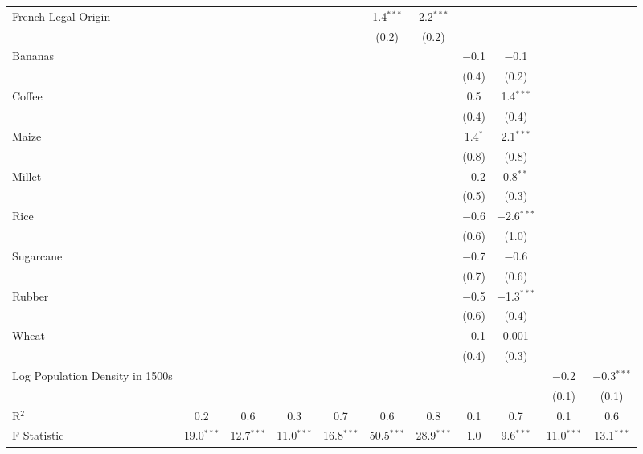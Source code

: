 \begin{table}[!htbp]
\begin{threeparttable}
\begin{tabular}{@{\extracolsep{0pt}}lcccccccccc}
  French Legal Origin &  &  &  &  & 1.4$^{***}$ & 2.2$^{***}$ &  &  &  &  \\ 
  &  &  &  &  & (0.2) & (0.2) &  &  &  &  \\ 
  Bananas &  &  &  &  &  &  & $-$0.1 & $-$0.1 &  &  \\ 
  &  &  &  &  &  &  & (0.4) & (0.2) &  &  \\ 
  Coffee &  &  &  &  &  &  & 0.5 & 1.4$^{***}$ &  &  \\ 
  &  &  &  &  &  &  & (0.4) & (0.4) &  &  \\ 
  Maize &  &  &  &  &  &  & 1.4$^{*}$ & 2.1$^{***}$ &  &  \\ 
  &  &  &  &  &  &  & (0.8) & (0.8) &  &  \\ 
  Millet &  &  &  &  &  &  & $-$0.2 & 0.8$^{**}$ &  &  \\ 
  &  &  &  &  &  &  & (0.5) & (0.3) &  &  \\ 
  Rice &  &  &  &  &  &  & $-$0.6 & $-$2.6$^{***}$ &  &  \\ 
  &  &  &  &  &  &  & (0.6) & (1.0) &  &  \\ 
  Sugarcane &  &  &  &  &  &  & $-$0.7 & $-$0.6 &  &  \\ 
  &  &  &  &  &  &  & (0.7) & (0.6) &  &  \\ 
  Rubber &  &  &  &  &  &  & $-$0.5 & $-$1.3$^{***}$ &  &  \\ 
  &  &  &  &  &  &  & (0.6) & (0.4) &  &  \\ 
  Wheat &  &  &  &  &  &  & $-$0.1 & 0.001 &  &  \\ 
  &  &  &  &  &  &  & (0.4) & (0.3) &  &  \\ 
  Log Population Density in 1500s &  &  &  &  &  &  &  &  & $-$0.2 & $-$0.3$^{***}$ \\ 
  &  &  &  &  &  &  &  &  & (0.1) & (0.1) \\ 
R$^{2}$ & 0.2 & 0.6 & 0.3 & 0.7 & 0.6 & 0.8 & 0.1 & 0.7 & 0.1 & 0.6 \\ 
F Statistic & 19.0$^{***}$ & 12.7$^{***}$ & 11.0$^{***}$ & 16.8$^{***}$ & 50.5$^{***}$& 28.9$^{***}$ & 1.0 & 9.6$^{***}$ & 11.0$^{***}$ & 13.1$^{***}$\\ 
 

\end{tabular}
\end{threeparttable}
\end{table}

